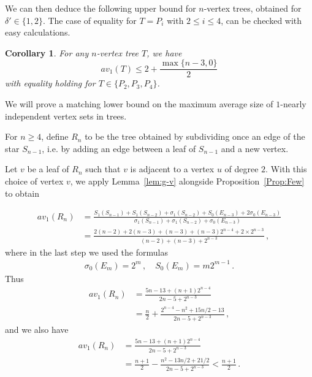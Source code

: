 \documentclass[a4paper,12pt]{amsart}
\newtheorem{corollary}[lemma]{Corollary}
\theoremstyle{remark}
\begin{document}
\medskip
We can then deduce the following upper bound for $n$-vertex trees, obtained for $\delta'\in \{1,2\}$. The case of equality for $T=P_i$ with $2\leq i\leq 4$, can be checked with easy calculations.
\begin{corollary}
For any $n$-vertex tree $T$, we have
$$
av_1(T)\leq 2+\frac{\max\{n-3,0\}}{2}
$$
with equality holding for $T\in \{P_2, P_3, P_4\}$.
\end{corollary}

\medskip
We will prove a matching lower bound on the maximum average size of $1$-nearly independent vertex sets in trees.

For $n\geq 4$, define $R_n$ to be the tree obtained by subdividing once an edge of the star $S_{n-1}$, i.e. by adding an edge between a leaf of $S_{n-1}$ and a new vertex. 

Let $v$ be a leaf of $R_n$ such that $v$ is adjacent to a vertex $u$ of degree $2$. With this choice of vertex $v$, we apply Lemma~\ref{lem:g-v} alongside Proposition~\ref{Prop:Few} to obtain

\begin{align*}
av_1(R_n) &=\frac{S_1(S_{n-1})+S_1(S_{n-2}) +\sigma_1(S_{n-2}) + S_0(E_{n-3})+2\sigma_0(E_{n-3})}{\sigma_1(S_{n-1})+\sigma_1(S_{n-2})+\sigma_0(E_{n-3})}\nonumber\\
&=\frac{2(n-2)+2(n-3) + (n-3) + (n-3)2^{n-4}+2\times2^{n-3}}{(n-2)+(n-3)+2^{n-3}}\,,
\end{align*}
where in the last step we used the formulas
\begin{align*}
\sigma_0(E_m)=2^m\,, \quad  S_0(E_m)=m 2^{m-1}\,.
\end{align*}
Thus
\begin{align*}
av_1(R_n) &=\frac{ 5n-13+ (n+1)2^{n-4}}{2n-5+2^{n-3}}\nonumber\\
&=\frac{n}{2}+\frac{2^{n-4}- n^2+15n/2-13}{2n-5+2^{n-3}}\nonumber\,,
\end{align*}
and we also have
\begin{align}
av_1(R_n)&=\frac{ 5n-13+ (n+1)2^{n-4}}{2n-5+2^{n-3}}\nonumber\\
&= \frac{n+1}{2} - \frac{n^2 -13n/2 +21/2}{2n-5+2^{n-3}} <\frac{n+1}{2}\,.
\label{Eq:n1}
\end{align} 

\end{document}

